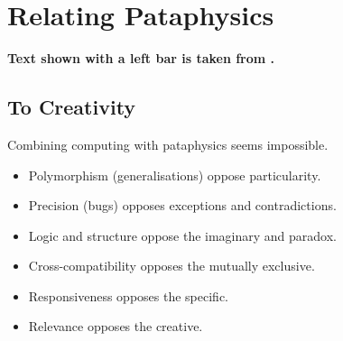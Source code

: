 


\section{Relating Pataphysics}

\textbf{Text shown with a left bar is taken from \autocite{Hugill2013d}.}

\subsection{To Creativity}

\begin{draft}
  Combining computing with pataphysics seems impossible.

  \begin{itemize}
    \item Polymorphism (generalisations) oppose particularity.
    \item Precision (bugs) opposes exceptions and contradictions.
    \item Logic and structure oppose the imaginary and paradox.
    \item Cross-compatibility opposes the mutually exclusive.
    \item Responsiveness opposes the specific.
    \item Relevance opposes the creative.
  \end{itemize}
\end{draft}

